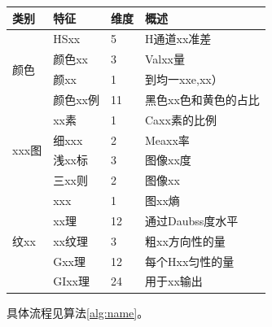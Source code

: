 \begin{table}[htbp]\footnotesize
	\label{tab:name}
    \begin{tabular}{p{1cm}llp{9.3cm}}
		\hline
		\rowcolor{gray!15}
		\textbf{类别}                   & \textbf{特征}             & \textbf{维度} & \textbf{概述}                                              \\ \hline
		\multirow{4}{*}{颜色}              & HSxx          & 5          & H通道xx准差 \\
		& 颜色xx             & 3          & Valxx量                           \\
		& 颜xx          & 1          & 到均一xxe,xx）                                                                                    \\
		& 颜色xx例                & 11         & 黑色xx色和黄色的占比                                                \\
		\hline
		\multirow{4}{*}{xxx图}        & xx素               & 1          & Caxx素的比例                           \\
		& 细xxx           & 2          & Meaxx率                                                                              \\
		& 浅xx标  & 3          & 图像xx度                                            \\
		& 三xx则            & 2          & 图像xx                                                  \\
		\hline
		\multirow{5}{*}{纹xx} & xxx & 1          & 图xx熵                                                           \\
		& xx理    & 12         & 通过Daubss度水平                                     \\
		& xx纹理                    & 3          & 粗xx方向性的量                                            \\
		& Gxx理           & 12         & 每个Hxx匀性的量                                       \\
		 & GIxx理          & 24         & 用于xx输出                                       \\ 
		\hline
	\end{tabular}
\end{table}
\vspace{-10pt}

具体流程见算法\ref{alg:name}。

